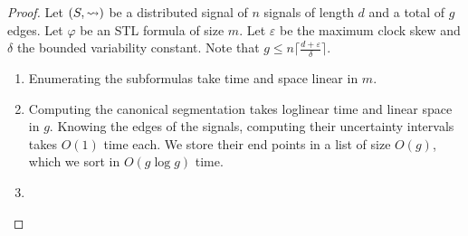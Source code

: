 \begin{proof}
	Let $(S, {\rightsquigarrow})$ be a distributed signal of $n$ signals of length $d$ and a total of $g$ edges.
	Let $\varphi$ be an STL formula of size $m$.
	Let $\varepsilon$ be the maximum clock skew and $\delta$ the bounded variability constant.
	Note that $g \leq n  \lceil \frac{d + \varepsilon}{\delta} \rceil$.
		
	\begin{enumerate}
		\item 
		Enumerating the subformulas take time and space linear in $m$.
		
		\item 

		Computing the canonical segmentation takes loglinear time and linear space in $g$.
		Knowing the edges of the signals, computing their uncertainty intervals takes $O(1)$ time each.
		We store their end points in a list of size $O(g)$, which we sort in $O(g \log g)$ time.
		
		\item
			

\end{enumerate}
\end{proof}
